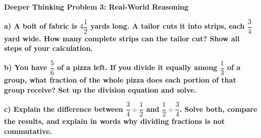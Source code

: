\documentclass[12pt, letterpaper, fleql]{article}
\begin{document}
\newpage

\begin{tcolorbox}[colback=black!5, colframe=black!50, boxrule=1pt, arc=4mm, left=6mm, right=6mm, top=5mm, bottom=5mm]
\textbf{Deeper Thinking Problem 3: Real-World Reasoning}

\medskip

\noindent
\textbf{a) A bolt of fabric is $4\dfrac{1}{2}$ yards long. A tailor cuts it into strips, each $\dfrac{3}{4}$ yard wide. How many complete strips can the tailor cut? Show all steps of your calculation.}

\vspace{3.5cm}

\noindent
\textbf{b) You have $\dfrac{5}{6}$ of a pizza left. If you divide it equally among $\dfrac{1}{3}$ of a group, what fraction of the whole pizza does each portion of that group receive? Set up the division equation and solve.}

\vspace{3.5cm}

\noindent
\textbf{c) Explain the difference between $\dfrac{3}{4} \div \dfrac{1}{2}$ and $\dfrac{1}{2} \div \dfrac{3}{4}$. Solve both, compare the results, and explain in words why dividing fractions is not commutative.}

\vspace{3cm}
\end{tcolorbox}
\end{document}
